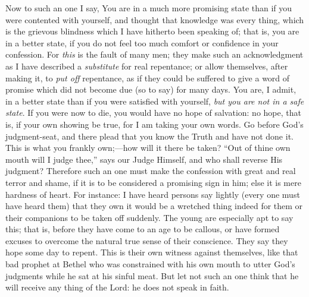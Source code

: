 Now to such an one I say, You are in a much more
promising state than if you were contented with yourself,
and thought that knowledge was every thing, which is the
grievous blindness which I have hitherto been speaking
of; that is, you are in a better state, if you do not
feel too much comfort or confidence in your confession.
For \emph{this} is the fault of many men; they make
such an acknowledgment as I have described a \emph{substitute}
for real repentance; or allow themselves, after making
it, to \emph{put off} repentance, as if they could be
suffered to give a word of promise which did not become
due (so to say) for many days. You are, I admit, in a
better state than if you were satisfied with yourself, \emph{but
you are not in a safe state}. If you were now to die,
you would have no hope of salvation: no hope, that is, if
your own showing be true, for I am taking your own words.
Go before God's judgment-seat, and there plead that you
know the Truth and have not done it. This is what you
frankly own;—how will it there be taken? ``Out
of thine own mouth will I judge thee,'' says our Judge Himself, and who shall reverse His judgment?
Therefore such an one must make the confession with great
and real terror and shame, if it is to be considered a
promising sign in him; else it is mere hardness of heart.
For instance: I have heard persons say lightly (every one
must have heard them) that they own it would be a
wretched thing indeed for them or their companions to be
taken off suddenly. The young are especially apt to say
this; that is, before they have come to an age to be
callous, or have formed excuses to overcome the natural
true sense of their conscience. They say they hope some
day to repent. This is their own witness against
themselves, like that bad prophet at Bethel who was
constrained with his own mouth to utter God's judgments
while he sat at his sinful meat. But let not such an one
think that he will receive any thing of the Lord: he does
not speak in faith.

